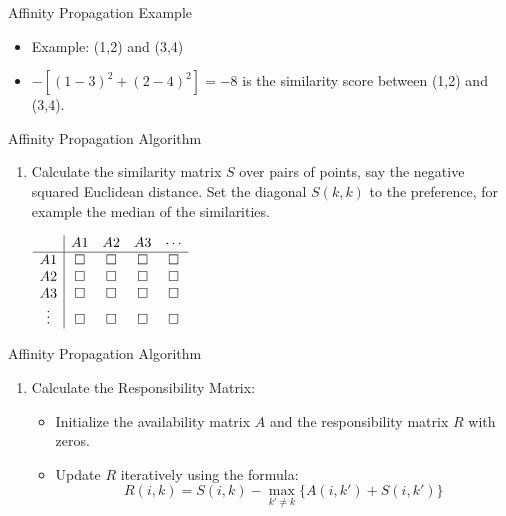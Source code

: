 \documentclass[aspectratio=169,xcolor=dvipsnames,svgnames,x11names,fleqn]{beamer}
\begin{document}
\begin{frame}{Affinity Propagation Example}
    \begin{itemize}
    \item Example: (1,2) and (3,4)
   \item $-\left[(1-3)^2 + (2-4)^2\right] = -8$ is the similarity score between (1,2) and (3,4).
\end{itemize}
\end{frame}

\begin{frame}{Affinity Propagation Algorithm}
    \begin{enumerate}
       \item Calculate the similarity matrix $S$ over pairs of points, say the negative squared Euclidean distance. Set the diagonal $S(k,k)$ to the preference, for example the median of the similarities.
        
        \vspace{0.5em}
        $\begin{array}{c|ccc c}
        & A1 & A2 & A3 & \cdots \\
        \hline
        A1 & \square & \square & \square & \square \\
        A2 & \square & \square & \square & \square \\
        A3 & \square & \square & \square & \square \\
        \vdots & \square & \square & \square & \square
        \end{array}$
        
    \end{enumerate}
    \end{frame}


\begin{frame}{Affinity Propagation Algorithm}

    \begin{enumerate}
        \item[2.] Calculate the Responsibility Matrix:
        \begin{itemize}
           \item Initialize the availability matrix $A$ and the responsibility matrix $R$ with zeros.
\item Update $R$ iteratively using the formula:
$$R(i, k) = S(i, k) - \max_{k' \neq k} \{ A(i, k') + S(i, k') \}$$
        \end{itemize}

    \end{enumerate}

\end{frame}
\end{document}
